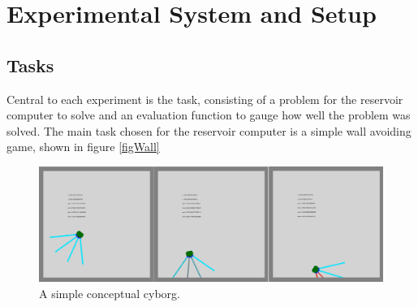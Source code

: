\chapter{Experimental System and Setup}
\section{Tasks}
Central to each experiment is the task, consisting of a problem for the
reservoir computer to solve and an evaluation function to gauge how well the
problem was solved.
The main task chosen for the reservoir computer is a simple wall avoiding game,
shown in figure \ref{figWall}

\begin{figure}[h!]
  \centering
  \includegraphics[width=1\textwidth]{fig/TAC/game2.png}
  \caption{A simple conceptual cyborg.}
  \label{cyborgOverviewSimple}
\end{figure}
\cleardoublepage

